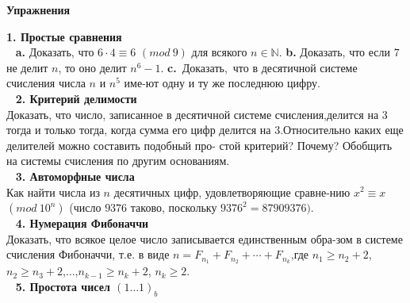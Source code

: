 \documentclass{mai_book}
\begin{document}
\cleartop
\ \\
\ \\
\ \\
\ \\
\ \\
    \begin{center} \textbf{\LARGE{Упражнения}} \end{center} 

\noindent\textbf{1. Простые сравнения}\\
\ \newline
\hspace*{15pt}\textbf{a.} Доказать, что $6 \cdot 4 \equiv 6$ $(mod\ 9)$ для всякого $n\in \mathbb{N}$.\newline
\hspace*{15pt}\textbf{b.} Доказать, что если $7$ не делит $n$, то оно делит $n^6 - 1$.\newline
\hspace*{15pt}\textbf{c.}~Доказать,~что в десятичной системе счисления числа $n$ и $n^5$
име-\newline ют одну и ту же последнюю цифру.\\
\ \newline
\noindent\textbf{2. Критерий делимости}\\

Доказать, что число, записанное в десятичной системе счисления,\newline делится на 3 тогда и только тогда, когда сумма его цифр делится на 3.\newline Относительно каких еще делителей можно составить подобный про-
\newline стой критерий? Почему? Обобщить на системы счисления по другим \newline основаниям.\\
\ \newline
\noindent\textbf{3. Автоморфные числа}\\

Как найти числа из $n$ десятичных цифр, удовлетворяющие сравне-\newline нию $x^2 \equiv x$ $(mod\ 10^n)$ (число $9376$ таково, поскольку $9376^2 = 87909376)$.\\
\ \newline
\noindent\textbf{4. Нумерация Фибоначчи}\\

Доказать, что всякое целое число записывается единственным обра-\newline зом в системе счисления Фибоначчи, т.е. в виде $n = F_{n_1} + F_{n_2}+ \cdots + F_{n_k}$,\newline где $n_1 \geqslant n_2 + 2$, $n_2 \geqslant n_3 + 2$,$\ldots$,$n_{k-1} \geqslant n_k+2$, $n_k \geqslant 2$.\\
\ \newline
\noindent\textbf{5. Простота чисел ${(1\ldots1)}_b$}\\
\end{document}
